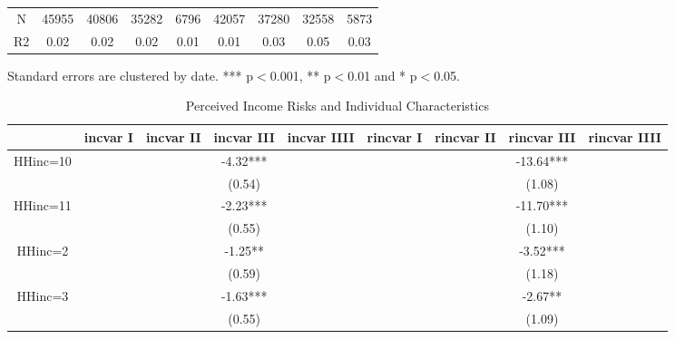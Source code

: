 \documentclass[12pt,notitlepage,onecolumn,aps,pra]{article}
\begin{document}
\begin{table}[ht]
\begin{adjustbox}{width={0.9\textwidth},totalheight={\textheight}}
\begin{threeparttable}
\begin{tabular}{ccccccccc}
N            &     45955 &     40806 &      35282 &        6796 &     42057 &      37280 &       32558 &         5873 \\
R2           &      0.02 &      0.02 &       0.02 &        0.01 &      0.01 &       0.03 &        0.05 &         0.03 \\
\bottomrule
\end{tabular}
\begin{tablenotes}\item Standard errors are clustered by date. *** p$<$0.001, ** p$<$0.01 and * p$<$0.05. 
\end{tablenotes}
\end{threeparttable}
\end{adjustbox}
\end{table}
\begin{table}[ht]
\centering
\begin{adjustbox}{width={0.9\textwidth},totalheight={\textheight}}
\begin{threeparttable}
\caption{Perceived Income Risks and Individual Characteristics}
\label{micro_reg}\begin{tabular}{ccccccccc}
\toprule
{} & incvar I & incvar II & incvar III & incvar IIII & rincvar I & rincvar II & rincvar III & rincvar IIII \\
\midrule
HHinc=10     &          &           &   -4.32*** &             &           &            &   -13.64*** &              \\
             &          &           &     (0.54) &             &           &            &      (1.08) &              \\
HHinc=11     &          &           &   -2.23*** &             &           &            &   -11.70*** &              \\
             &          &           &     (0.55) &             &           &            &      (1.10) &              \\
HHinc=2      &          &           &    -1.25** &             &           &            &    -3.52*** &              \\
             &          &           &     (0.59) &             &           &            &      (1.18) &              \\
HHinc=3      &          &           &   -1.63*** &             &           &            &     -2.67** &              \\
             &          &           &     (0.55) &             &           &            &      (1.09) &              \\

\end{tabular}
\end{threeparttable}
\end{adjustbox}
\end{table}
\end{document}

